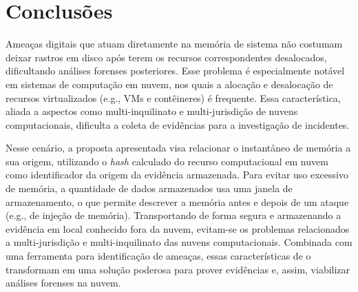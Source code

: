 \chapter{Conclusões}
\label{sec:proposta-concl-recom}

%


%
Ameaças digitais que atuam diretamente na memória de sistema não costumam deixar rastros em disco após terem os recursos correspondentes desalocados, dificultando análises forenses posteriores.
%
Esse problema é especialmente notável em sistemas de computação em nuvem, nos quais a alocação e desalocação de recursos virtualizados (e.g., VMs e contêineres) é frequente.
%
Essa característica, aliada a aspectos como multi-inquilinato e multi-jurisdição de nuvens computacionais, dificulta a coleta de evidências para a investigação de incidentes.

%
Nesse cenário, a proposta apresentada visa relacionar o instantâneo de memória a sua origem, utilizando o \textit{hash} calculado do recurso computacional em nuvem como identificador da origem da evidência armazenada.
%
Para evitar uso excessivo de memória, a quantidade de dados armazenados usa uma janela de armazenamento, o que permite descrever a memória antes e depois de um ataque (e.g., de injeção de memória). 
%
Transportando de forma segura e armazenando a evidência em local conhecido fora da nuvem, evitam-se os problemas relacionados a multi-jurisdição e multi-inquilinato das nuvens computacionais.
%
Combinada com uma ferramenta para identificação de ameaças, essas características de \fancyname o transformam em uma solução poderosa para prover evidências e, assim, viabilizar análises forenses na nuvem.
